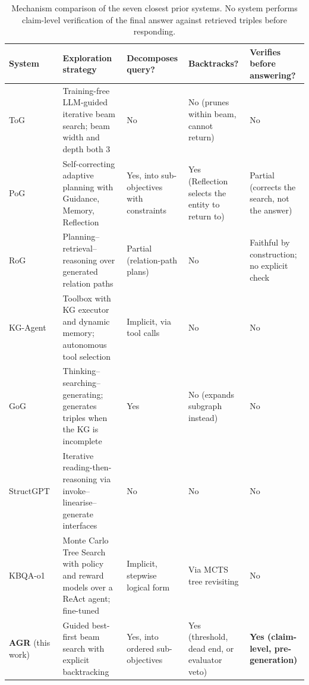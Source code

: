 \begin{table}[!tb]
  \begin{center}
    \caption[Mechanism comparison of the seven closest prior systems]{Mechanism
    comparison of the seven closest prior systems. No system performs
    claim-level verification of the final answer against retrieved triples
    before responding.}
    \label{tab:mechanisms}
    \footnotesize
    \begin{tabular}{|l|L{38mm}|L{22mm}|L{22mm}|L{25mm}|}
      \hline
      \textbf{System} & \textbf{Exploration strategy} & \textbf{Decomposes
      query?} & \textbf{Backtracks?} & \textbf{Verifies before answering?} \\
      \hline
      ToG~\cite{sun2024think} & Training-free LLM-guided iterative beam search;
      beam width and depth both 3 & No & No (prunes within beam, cannot return)
      & No \\
      \hline
      PoG~\cite{chen2024plan} & Self-correcting adaptive planning with Guidance,
      Memory, Reflection & Yes, into sub-objectives with constraints & Yes
      (Reflection selects the entity to return to) & Partial (corrects the
      search, not the answer) \\
      \hline
      RoG~\cite{luo2024reasoning} & Planning--retrieval--reasoning over
      generated relation paths & Partial (relation-path plans) & No & Faithful
      by construction; no explicit check \\
      \hline
      KG-Agent~\cite{jiang2024kgagent} & Toolbox with KG executor and dynamic
      memory; autonomous tool selection & Implicit, via tool calls & No & No \\
      \hline
      GoG~\cite{xu2024generate} & Thinking--searching--generating; generates
      triples when the KG is incomplete & Yes & No (expands subgraph instead) &
      No \\
      \hline
      StructGPT~\cite{jiang2023structgpt} & Iterative reading-then-reasoning via
      invoke--linearise--generate interfaces & No & No & No \\
      \hline
      KBQA-o1~\cite{luo2025kbqao1} & Monte Carlo Tree Search with policy and
      reward models over a ReAct agent; fine-tuned & Implicit, stepwise logical
      form & Via MCTS tree revisiting & No \\
      \hline
      \textbf{AGR} (this work) & Guided best-first beam search with explicit
      backtracking & Yes, into ordered sub-objectives & Yes (threshold, dead
      end, or evaluator veto) & \textbf{Yes (claim-level, pre-generation)} \\
      \hline
    \end{tabular}
  \end{center}
\end{table}

